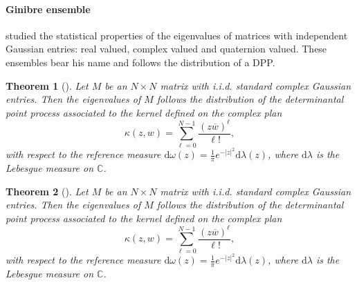 \documentclass[twoside,11pt]{book}
\newtheorem{theorem}{Theorem}
\numberwithin{theorem}{chapter}
\numberwithin{definition}{chapter}
\numberwithin{proposition}{chapter}
\numberwithin{corollary}{chapter}
\numberwithin{example}{chapter}
\numberwithin{lemma}{chapter}
\begin{document}







\paragraph{Ginibre ensemble}
\cite{Gin65} studied the statistical properties of the eigenvalues of matrices with independent Gaussian entries: real valued, complex valued and quaternion valued. These ensembles bear his name and follows the distribution of a DPP.
\begin{theorem}[\cite{Gin65}]
Let $M$ be an $N\times N$ matrix with i.i.d. standard complex Gaussian entries.
Then the eigenvalues of $M$ follows the distribution of the determinantal point
process associated to the kernel defined on the complex plan
\begin{equation}
\kappa(z,w) = \sum\limits_{\ell =0}^{N-1} \frac{(z \overline{w})^{\ell}}{\ell!},
\end{equation}
with respect to the reference measure $\mathrm{d}\omega(z) = \frac{1}{\pi}e^{-|z|^{2}} \mathrm{d}\lambda(z)$, where $\mathrm{d}\lambda$ is the Lebesgue measure on $\mathbb{C}$.
\end{theorem}





\begin{theorem}[\cite{Gin65}]
Let $M$ be an $N\times N$ matrix with i.i.d. standard complex Gaussian entries.
Then the eigenvalues of $M$ follows the distribution of the determinantal point
process associated to the kernel defined on the complex plan
\begin{equation}
\kappa(z,w) = \sum\limits_{\ell =0}^{N-1} \frac{(z \overline{w})^{\ell}}{\ell!},
\end{equation}
with respect to the reference measure $\mathrm{d}\omega(z) = \frac{1}{\pi}e^{-|z|^{2}} \mathrm{d}\lambda(z)$, where $\mathrm{d}\lambda$ is the Lebesgue measure on $\mathbb{C}$.
\end{theorem}
\end{document}
